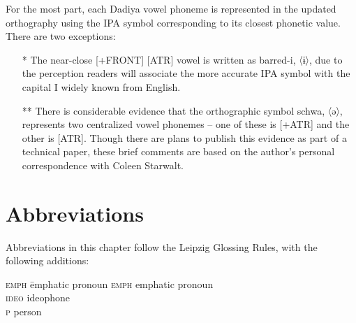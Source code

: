 \documentclass[output=paper]{langscibook}
\begin{document}
\noindent For the most part, each Dadiya vowel phoneme is represented in the updated orthography \citep{Committee2018} using the IPA symbol corresponding to its closest phonetic value. There are two exceptions:

\begin{itemize}
\item[*] The near-close [+FRONT] [\textminus ATR] vowel is written as barred-i,  〈ɨ〉, due to the perception readers will associate the more accurate IPA symbol with the capital I widely known from English.
\item[**] There is considerable evidence that the orthographic symbol schwa, 〈ə〉, represents two centralized vowel phonemes -- one of these is [+ATR] and the other is [\textminus ATR]. Though there are plans to publish this evidence as part of a technical paper, these brief comments are based on the author's personal correspondence with Coleen Starwalt.
\end{itemize}

\section*{Abbreviations}

Abbreviations in this chapter follow the Leipzig Glossing Rules, with the following additions:

\begin{tabbing}
\textsc{emph}\hspace{1ex} \= emphatic pronoun\kill
\textsc{emph} \> emphatic pronoun\\
\textsc{ideo} \> ideophone\\
\textsc{p}    \> person\\
\end{tabbing}

{\sloppy\printbibliography[heading=subbibliography,notkeyword=this]}
\end{document}
